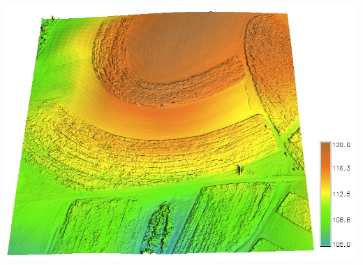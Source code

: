 \documentclass[xcolor={dvipsnames,usenames},beamer]{beamer}
\begin{document}
\begin{frame}{\coursesTitle}
\begin{columns}[c]
\includegraphics[height=0.5\textheight]{./images/edu/dem}
\hspace{0.2\textwidth}
\end{columns}

\end{frame}
\end{document}
